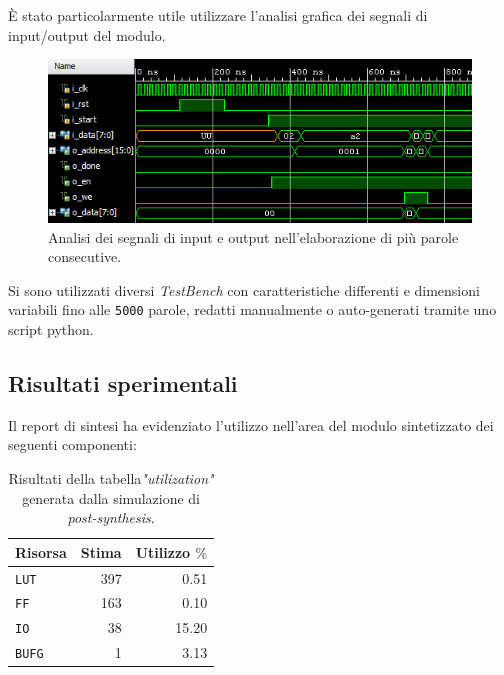\documentclass{article}
\begin{document}
È stato particolarmente utile utilizzare l'analisi grafica dei segnali di input/output del modulo.
\vspace{0,2cm}

\begin{figure}[ht]
    \centering
    \includegraphics[scale=0.9]{./photo5.png}
    \caption{Analisi dei segnali di input e output nell'elaborazione di più parole consecutive.}
\end{figure}
\vspace{0,5cm}

Si sono utilizzati diversi \emph{TestBench} con caratteristiche differenti e dimensioni variabili fino alle \texttt{5000} parole, redatti manualmente o auto-generati tramite uno script python.
\vspace{0,2cm}

\clearpage
\pagebreak

\subsection{Risultati sperimentali}
Il report di sintesi ha evidenziato l’utilizzo nell’area del modulo sintetizzato dei seguenti componenti:

\begin{table}[ht]
    \centering
    \small
    \def\arraystretch{1.3} %
    \caption{Risultati della tabella\footnotemark \emph{"utilization"} generata dalla simulazione di \emph{post-synthesis}.}
    \begin{tabular}[width=4cm]{|| l | r | r ||}
        \hline
        Risorsa       & Stima & Utilizzo $\%$              \\
        \hline \hline
        \texttt{LUT}  & 397   & 0.51                       \\ \hline
        \texttt{FF}   & 163    & 0.10                       \\ \hline
        \texttt{IO}   & 38    & 15.20                      \\ \hline
        \texttt{BUFG} & 1     & 3.13                       \\ \hline
    \end{tabular}
\end{table}
\vspace{0,2cm}
\end{document}

